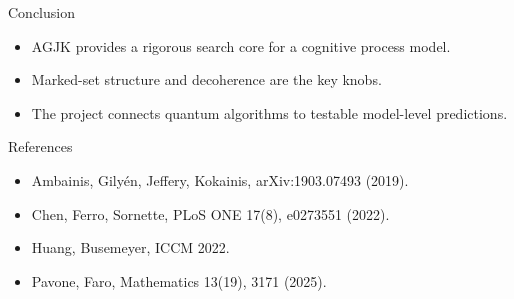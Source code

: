 \documentclass[aspectratio=169,11pt]{beamer}
\begin{document}
\begin{frame}{Conclusion}
  \begin{itemize}
    \item AGJK provides a rigorous search core for a cognitive process model.
    \item Marked-set structure and decoherence are the key knobs.
    \item The project connects quantum algorithms to testable model-level predictions.
  \end{itemize}
\end{frame}

\begin{frame}{References}
  \small
  \begin{itemize}
    \item Ambainis, Gily\'en, Jeffery, Kokainis, arXiv:1903.07493 (2019).
    \item Chen, Ferro, Sornette, PLoS ONE 17(8), e0273551 (2022).
    \item Huang, Busemeyer, ICCM 2022.
    \item Pavone, Faro, Mathematics 13(19), 3171 (2025).
  \end{itemize}
\end{frame}
\end{document}
